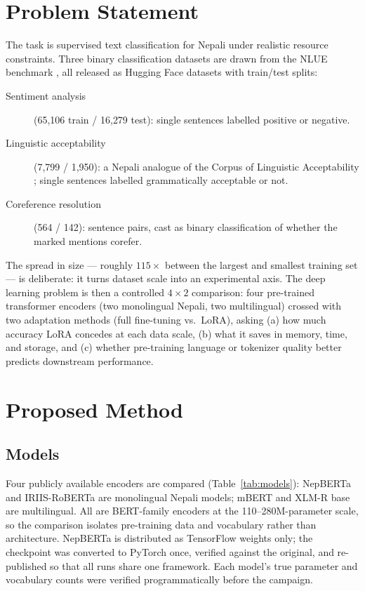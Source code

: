 \documentclass[11pt,a4paper]{article}
\begin{document}
\section{Problem Statement}
\label{sec:problem}

The task is supervised text classification for Nepali under realistic
resource constraints. Three binary classification datasets are drawn from
the NLUE benchmark \citep{nyachhyon2025nlue}, all released as
Hugging Face datasets with train/test splits:

\begin{description}
  \item[Sentiment analysis] (65{,}106 train / 16{,}279 test): single
  sentences labelled positive or negative.
  \item[Linguistic acceptability] (7{,}799 / 1{,}950): a Nepali analogue
  of the Corpus of Linguistic Acceptability \citep{warstadt2019cola};
  single sentences labelled grammatically acceptable or not.
  \item[Coreference resolution] (564 / 142): sentence pairs, cast as
  binary classification of whether the marked mentions corefer.
\end{description}

The spread in size --- roughly $115\times$ between the largest and
smallest training set --- is deliberate: it turns dataset scale into an
experimental axis. The deep learning problem is then a controlled
$4 \times 2$ comparison: four pre-trained transformer encoders (two
monolingual Nepali, two multilingual) crossed with two adaptation methods
(full fine-tuning vs.\ LoRA), asking (a) how much accuracy LoRA concedes
at each data scale, (b) what it saves in memory, time, and storage, and
(c) whether pre-training language or tokenizer quality better predicts
downstream performance.

\section{Proposed Method}
\label{sec:method}

\subsection{Models}

Four publicly available encoders are compared
(Table~\ref{tab:models}): NepBERTa \citep{timilsina2022nepberta} and
IRIIS-RoBERTa \citep{iriisroberta2024} are monolingual Nepali models;
mBERT \citep{devlin2019bert} and XLM-R base \citep{conneau2020xlmr} are
multilingual. All are BERT-family encoders at the 110--280M-parameter
scale, so the comparison isolates pre-training data and vocabulary rather
than architecture. NepBERTa is distributed as TensorFlow weights only;
the checkpoint was converted to PyTorch once, verified against the
original, and re-published so that all runs share one framework.
Each model's true parameter and vocabulary counts were verified
programmatically before the campaign.
\end{document}
